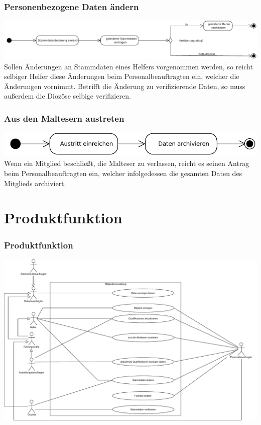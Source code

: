 \documentclass{beamer}
\begin{document}
\begin{frame}
\frametitle{Personenbezogene Daten ändern}
\includegraphics[width=\textwidth]{PDF/BusinessP/Daten_aendern.pdf}
\pause
Sollen Änderungen an Stammdaten eines Helfers vorgenommen werden, so reicht selbiger Helfer diese Änderungen beim Personalbeauftragten ein, welcher die Änderungen vornimmt. Betrifft die Änderung zu verifizierende Daten, so muss außerdem die Diozöse selbige verifizieren.
\end{frame}


\begin{frame}
\frametitle{Aus den Maltesern austreten}
\includegraphics[width=\textwidth]{PDF/BusinessP/Austreten.pdf}
\pause
Wenn ein Mitglied beschließt, die Malteser zu verlassen, reicht es seinen Antrag beim Personalbeauftragten ein, welcher infolgedessen die gesamten Daten des Mitglieds archiviert.
\end{frame}


\section{Produktfunktion}		
\begin{frame}
\frametitle{Produktfunktion}
\includegraphics[height=0.75 \textheight]{PDF/Use_Case.pdf}
\end{frame}
\end{document}
